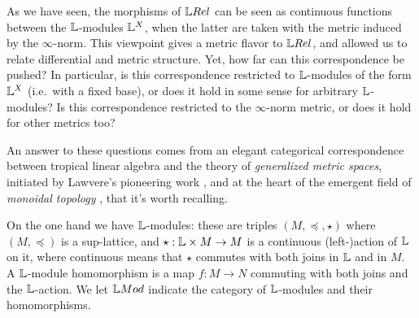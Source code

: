 

As we have seen, the morphisms of $\LREL$ can be seen as continuous functions between the $\mathbb{L}$-modules $\mathbb{L}^{X}$, when the latter are taken with the metric induced by the $\infty$-norm. This viewpoint gives a metric flavor to $\LREL$, and allowed us to relate differential and metric structure. Yet, how far can this correspondence be pushed?
In particular, is this correspondence restricted to $\mathbb{L}$-modules of the form $\mathbb{L}^{X}$ (i.e.~with a fixed base), or does it hold in some sense for arbitrary $\mathbb{L}$-modules? Is this correspondence restricted to the $\infty$-norm metric, or does it hold for other metrics too?

An answer to these questions comes from an elegant categorical correspondence between tropical linear algebra and the theory of \emph{generalized metric spaces}, initiated by Lawvere's pioneering work \cite{Lawvere1973}, and at the heart of the emergent field of \emph{monoidal topology} \cite{Hofmann2014, Stubbe2014}, that it's worth recalling.

 
%
%
%


On the one hand we have $\mathbb{L}$-modules: these are triples $(M,\preceq, \star)$ where $(M, \preceq)$ is a sup-lattice, and $\star: \mathbb{L} \times M \to M$ is a continuous (left-)action of $\mathbb{L}$ on it, where continuous means that $\star$ commutes with both joins in $\mathbb{L}$ and in $M$.%
A $\mathbb{L}$-module homomorphism is a map $f:M\to N$ commuting with both joins and the $\mathbb{L}$-action. We let $\Mod$ indicate the category of $\mathbb{L}$-modules and their homomorphisms. 
 
